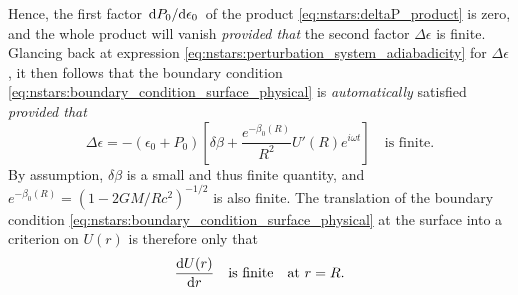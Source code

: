 Hence, the first factor $\odv{P_0}/{\epsilon_0}$ of the product \eqref{eq:nstars:deltaP_product} is zero, and the whole product will vanish \emph{provided that} the second factor $\Delta \epsilon$ is finite.
Glancing back at expression \eqref{eq:nstars:perturbation_system_adiabadicity} for $\Delta \epsilon$, it then follows that the boundary condition \eqref{eq:nstars:boundary_condition_surface_physical} is \emph{automatically} satisfied \emph{provided that}
\begin{equation}
	\Delta \epsilon = - \left( \epsilon_0 + P_0 \right) \left[ \delta\beta + \frac{e^{-\beta_0(R)}}{R^2} U'(R) e^{i \omega t} \right] \quad \text{is finite}.
\end{equation}
By assumption, $\delta\beta$ is a small and thus finite quantity, and $e^{-\beta_0(R)} = \left( 1 - 2 G M / R c^2 \right)^{-1/2}$ is also finite.
The translation of the boundary condition \eqref{eq:nstars:boundary_condition_surface_physical} at the surface into a criterion on $U(r)$ is therefore only that
\begin{equation}
	\odv{U(r)}{r} \quad \text{is finite} \quad \text{at } r = R.
\label{eq:nstars:boundary_condition_surface_mathematical}
\end{equation}

